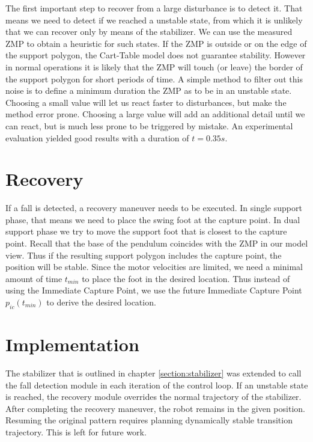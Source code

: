 \documentclass[english,ngerman]{KITreprt}
\begin{document}
The first important step to recover from a large disturbance is to
detect it. That means we need to detect if we reached a unstable state,
from which it is unlikely that we can recover only by means of the
stabilizer. We can use the measured ZMP to obtain a heuristic for such
states. If the ZMP is outside or on the edge of the support polygon, the
Cart-Table model does not guarantee stability. However in normal
operations it is likely that the ZMP will touch (or leave) the border of
the support polygon for short periods of time. A simple method to filter
out this noise is to define a minimum duration the ZMP as to be in an
unstable state. Choosing a small value will let us react faster to
disturbances, but make the method error prone. Choosing a large value
will add an additional detail until we can react, but is much less prone
to be triggered by mistake. An experimental evaluation yielded good
results with a duration of $t = 0.35s$.

\section{Recovery}\label{recovery}

If a fall is detected, a recovery maneuver needs to be executed. In
single support phase, that means we need to place the swing foot at the
capture point. In dual support phase we try to move the support foot
that is closest to the capture point. Recall that the base of the
pendulum coincides with the ZMP in our model view. Thus if the resulting
support polygon includes the capture point, the position will be stable.
Since the motor velocities are limited, we need a minimal amount of time
$t_{min}$ to place the foot in the desired location. Thus instead of
using the Immediate Capture Point, we use the future Immediate Capture
Point $p_{ic}(t_{min})$ to derive the desired location.

\section{Implementation}\label{implementation-2}

The stabilizer that is outlined in chapter \ref{section:stabilizer} was
extended to call the fall detection module in each iteration of the
control loop. If an unstable state is reached, the recovery module
overrides the normal trajectory of the stabilizer. After completing the
recovery maneuver, the robot remains in the given position. Resuming the
original pattern requires planning dynamically stable transition
trajectory. This is left for future work.
\end{document}
